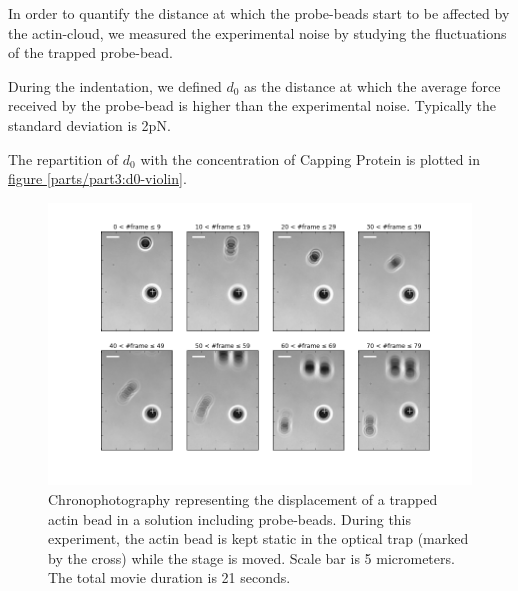 \documentclass[A4paperpaper,11pt,english]{sphinxmanual}
\begin{document}
In order to quantify the distance at which the probe-beads start to be affected by the actin-cloud,
we measured the experimental noise by studying the fluctuations of the trapped probe-bead.

During the indentation, we defined \(d_0\) as the distance at which the
average force received by the probe-bead is higher than the experimental noise.
Typically the standard deviation is 2pN.

The repartition of \(d_0\) with the concentration of Capping Protein is
plotted in \hyperref[parts/part3:d0-violin]{figure  \ref*{parts/part3:d0-violin}}.
\begin{figure}[htbp]
\centering
\capstart

\includegraphics[width=0.850\linewidth]{cloud-repelling.png}
\caption{Chronophotography representing the displacement of a trapped actin bead in a
solution including probe-beads. During this experiment, the actin bead is kept
static in the optical trap (marked by the cross) while the stage is moved.
Scale bar is 5 micrometers. The total movie duration is 21 seconds.}\label{parts/part3:cloud-repelling}\end{figure}
\end{document}
